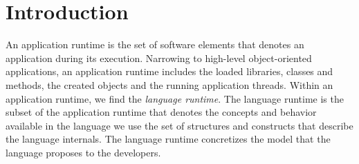 
\chapter{Introduction}
\minitoc


%
%


An application runtime is the set of software elements that denotes an application during its execution. Narrowing to high-level object-oriented applications, an application runtime includes \eg the loaded libraries, classes and methods, the created objects and the running application threads. Within an application runtime, we find the \emph{language runtime}. The language runtime is the subset of the application runtime that denotes the concepts and behavior available in the language we use \ie the set of structures and constructs that describe the language internals. The language runtime concretizes the model that the language proposes to the developers.

